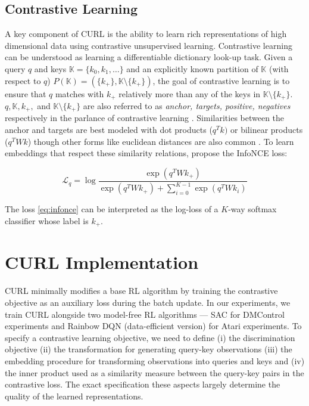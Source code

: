 \subsection{Contrastive Learning}

A key component of CURL is the ability to learn rich representations of high dimensional data using contrastive unsupervised learning. Contrastive learning \cite{hadsell2006dimensionality, lecun2006tutorial, oord2018representation, wu2018unsupervised, he2019momentum} can be understood as learning a differentiable dictionary look-up task. Given a query $q$ and keys $\mathbb{K} = \{k_0, k_1, \dots \}$ and an explicitly known partition of $\mathbb{K}$ (with respect to $q$) $P(\mathbb{K}) = ( \{k_{+}\}, \mathbb{K} \setminus \{k_{+}\} )$, the goal of contrastive learning is to ensure that $q$ matches with $k_{+}$ relatively more than any of the keys in $\mathbb{K} \setminus \{k_{+}\}$. $q, \mathbb{K}, k_{+},$ and $\mathbb{K} \setminus \{k_{+}\}$ are also referred to as {\it anchor, targets, positive, negatives} respectively in the parlance of contrastive learning \cite{oord2018representation, he2019momentum}. Similarities between the anchor and targets are best modeled with dot products ($q^Tk)$ \cite{wu2018unsupervised, he2019momentum} or bilinear products ($q^TWk$) \cite{oord2018representation, henaff2019data} though other forms like euclidean distances are also common \cite{schroff2015facenet, wang2015unsupervised}. To learn embeddings that respect these similarity relations, \citet{oord2018representation} propose the InfoNCE loss:

\begin{equation}\label{eq:infonce}
   \mathcal L_{q} = \log \frac{\exp(q^T W k_{+})}{ \exp(q^T W k_{+}) +  \sum_{i=0}^{K-1} \exp(q^T W k_{i})}
\end{equation}

The loss \ref{eq:infonce} can be interpreted as the log-loss of a $K$-way softmax classifier whose label is $k_{+}$. 


\section{CURL Implementation}

CURL minimally modifies a base RL algorithm by training the contrastive objective as an auxiliary loss during the batch update. In our experiments, we train CURL alongside two model-free RL algorithms --- SAC for DMControl experiments and Rainbow DQN (data-efficient version) for Atari experiments. To specify a contrastive learning objective, we need to define (i) the discrimination objective (ii) the transformation for generating query-key observations (iii) the embedding procedure for transforming observations into queries and keys and (iv) the inner product used as a similarity measure between the query-key pairs in the contrastive loss. The exact specification these aspects largely determine the quality of the learned representations.

